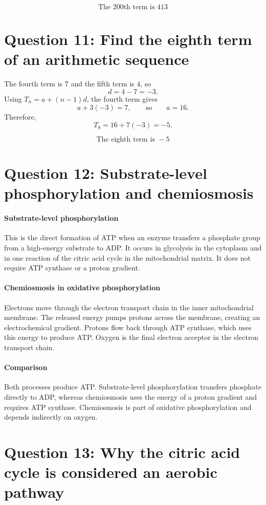 \documentclass[11pt]{article}
\begin{document}
\[
\boxed{\text{The 200th term is }413}
\]

\section*{Question 11: Find the eighth term of an arithmetic sequence}

The fourth term is \(7\) and the fifth term is \(4\), so
\[
d=4-7=-3.
\]
Using \(T_n=a+(n-1)d\), the fourth term gives
\[
a+3(-3)=7,
\qquad\text{so}\qquad
a=16.
\]
Therefore,
\[
T_8=16+7(-3)=-5.
\]

\[
\boxed{\text{The eighth term is }-5}
\]

\section*{Question 12: Substrate-level phosphorylation and chemiosmosis}

\paragraph{Substrate-level phosphorylation}
This is the direct formation of ATP when an enzyme transfers a phosphate group from a high-energy substrate to ADP. It occurs in glycolysis in the cytoplasm and in one reaction of the citric acid cycle in the mitochondrial matrix. It does not require ATP synthase or a proton gradient.

\paragraph{Chemiosmosis in oxidative phosphorylation}
Electrons move through the electron transport chain in the inner mitochondrial membrane. The released energy pumps protons across the membrane, creating an electrochemical gradient. Protons flow back through ATP synthase, which uses this energy to produce ATP. Oxygen is the final electron acceptor in the electron transport chain.

\paragraph{Comparison}
Both processes produce ATP. Substrate-level phosphorylation transfers phosphate directly to ADP, whereas chemiosmosis uses the energy of a proton gradient and requires ATP synthase. Chemiosmosis is part of oxidative phosphorylation and depends indirectly on oxygen.

\section*{Question 13: Why the citric acid cycle is considered an aerobic pathway}
\end{document}
